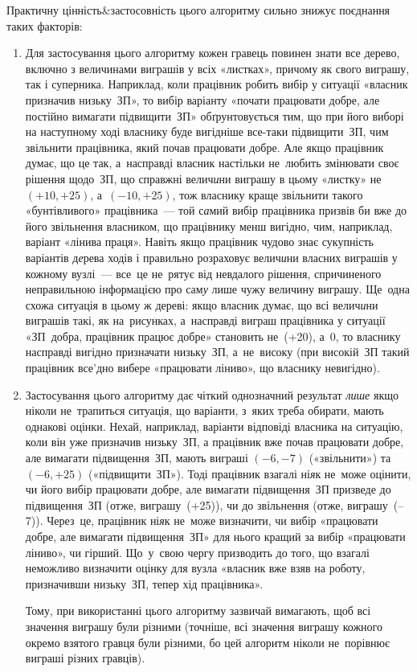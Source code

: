 Практичну цінність\&застосовність цього алгоритму сильно знижує поєднання таких факторів:
\begin{enumerate}
\item
Для застосування цього алгоритму кожен гравець повинен знати все дерево, включно з величинами виграшів у всіх «листках», причому як свого виграшу, так і суперника.
Наприклад, коли працівник робить вибір у ситуації «власник призначив низьку~ЗП», то вибір варіанту «почати працювати добре, але постійно вимагати підвищити~ЗП» обґрунтовується тим, що при його виборі на наступному ході власнику буде вигідніше все-таки підвищити~ЗП, чим звільнити працівника, який почав працювати добре. Але якщо працівник думає, що це так, а~насправді власник настільки не~любить змінювати своє рішення щодо~ЗП, що справжні велич{\it и}ни виграшу в цьому «листку» не~$(+10,+25)$, а~$(-10,+25)$, тож власнику краще звільнити такого «бунтівливого» працівника~--- той с{\it а}мий вибір працівника призвів би вже до його звільнення власником, що працівнику менш вигідно, чим, наприклад, варіант «лінива праця». Навіть якщо працівник чудово знає сукупність варіантів д{\it е}рева ходів і правильно розраховує велич{\it и}ни власних виграшів у кожному вузлі~--- все~це не~рятує від невдалого рішення, спричиненого неправильною інформацією про сам{\it у} лише чужу величину виграшу. Ще~одна схожа ситуація в цьому ж дереві: якщо власник думає, що всі велич{\it и}ни виграшів такі, як на~рисунках, а~насправді виграш працівника у ситуації «ЗП~добра, працівник працює добре» становить не~(+20), а~0, то власнику насправді вигідно призначати низьку~ЗП, а~не~високу (при високій~ЗП такий працівник все'дно вибере «працювати ліниво», що власнику невигідно).
\item
Застосування цього алгоритму дає чіткий однозначний результат {\it лише} якщо ніколи не~трапиться ситуація, що варіанти, з~яких треба обирати, мають однакові оцінки. Нехай, наприклад, варіанти відповіді власника на ситуацію, коли він уже призначив низьку~ЗП, а працівник вже почав працювати добре, але вимагати підвищення~ЗП, мають виграші $(-6,-7)$ («звільнити») та $(-6,+25)$ («підвищити~ЗП»). Тоді працівник взагалі ні{\it я}к не~може оцінити, чи його вибір працювати добре, але вимагати підвищення~ЗП призведе до підвищення~ЗП (отже, виграшу~(+25)), чи до звільнення (отже, виграшу~(–7)). Через~це, працівник ні{\it я}к не~може визначити, чи вибір «працювати добре, але вимагати підвищення~ЗП» для нього кращий за вибір «працювати ліниво», чи гірший.
Що~у~свою чергу призводить до того, що взагалі неможливо визначити оцінку для вузла «власник вже взяв на роботу, призначивши низьку~ЗП, тепер хід працівника».

Тому, при використанні цього алгоритму зазвичай вимагають, щоб всі значення виграшу були різними (точніше, всі значення виграшу кожного окремо взятого гравця були різними, бо цей алгоритм ніколи не~порівнює виграші різних гравців). 

\end{enumerate}

